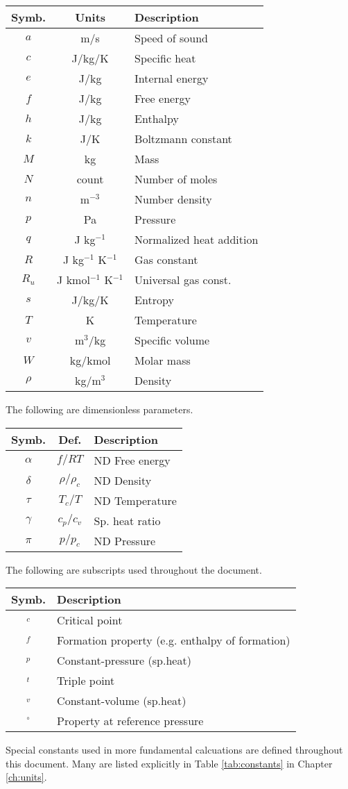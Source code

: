\vspace{1em}
\begin{tabular}{|ccl|}
\hline
Symb. & Units & Description\\
\hline
$a$ & m/s & Speed of sound\\
$c$ & J/kg/K & Specific heat\\
$e$ & J/kg & Internal energy\\
$f$ & J/kg & Free energy\\
$h$ & J/kg & Enthalpy\\
$k$ & J/K & Boltzmann constant\\
$M$ & kg & Mass\\
$N$ & count & Number of moles\\
$n$ & m$^{-3}$ & Number density\\
$p$ & Pa & Pressure\\
$q$ & J kg$^{-1}$ & Normalized heat addition\\
$R$ & J kg$^{-1}$ K$^{-1}$ & Gas constant\\
$R_u$ & J kmol$^{-1}$ K$^{-1}$ & Universal gas const.\\
$s$ & J/kg/K & Entropy\\
$T$ & K & Temperature\\
$v$ & m$^3$/kg & Specific volume\\
$W$ & kg/kmol & Molar mass\\
$\rho$ & kg/m$^3$ & Density\\
\hline
\end{tabular}
\vspace{1em}

The following are dimensionless parameters.

\vspace{1em}
\begin{tabular}{|ccl|}
\hline
Symb. & Def. & Description\\
\hline
$\alpha$ & $f / RT$ & ND Free energy\\
$\delta$ & $\rho/\rho_c$ & ND Density\\
$\tau$ & $T_c / T$ & ND Temperature\\
$\gamma$ & $c_p / c_v$ & Sp. heat ratio\\
$\pi$ & $p / p_c$ & ND Pressure\\
\hline
\end{tabular}
\vspace{1em}

The following are subscripts used throughout the document.

\vspace{1em}
\begin{tabular}{|cl|}
\hline
Symb. & Description\\
\hline
$_c$ & Critical point\\
$_f$ & Formation property (e.g. enthalpy of formation)\\
$_p$ & Constant-pressure (sp.heat)\\
$_t$ & Triple point\\
$_v$ & Constant-volume (sp.heat)\\
$^\circ$ & Property at reference pressure\\
\hline
\end{tabular}

Special constants used in more fundamental calcuations are defined throughout this document.  Many are listed explicitly in Table \ref{tab:constants} in Chapter \ref{ch:units}.
